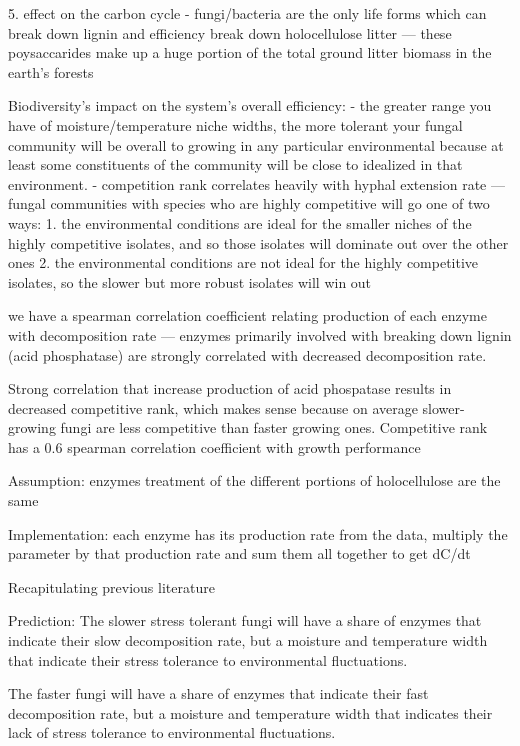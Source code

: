 \documentclass[12pt]{article}
\begin{document}
\begin{multicols}{2}
5. effect on the carbon cycle
- fungi/bacteria are the only life forms which can break down lignin and efficiency break down holocellulose litter — these poysaccarides make up a huge portion of the total ground litter biomass in the earth's forests

Biodiversity's impact on the system's overall efficiency:
- the greater range you have of moisture/temperature niche widths, the more tolerant your fungal community will be overall to growing in any particular environmental because at least some constituents of the community will be close to idealized in that environment.
- competition rank correlates heavily with hyphal extension rate — fungal communities with species who are highly competitive will go one of two ways: 1. the environmental conditions are ideal for the smaller niches of the highly competitive isolates, and so those isolates will dominate out over the other ones 2. the environmental conditions are not ideal for the highly competitive isolates, so the slower but more robust isolates will win out

we have a spearman correlation coefficient relating production of each enzyme with decomposition rate — enzymes primarily involved with breaking down lignin (acid phosphatase) are strongly correlated with decreased decomposition rate.

Strong correlation that increase production of acid phospatase results in decreased competitive rank, which makes sense because on average slower-growing fungi are less competitive than faster growing ones. Competitive rank has a 0.6 spearman correlation coefficient with growth performance

Assumption: enzymes treatment of the different portions of holocellulose are the same 

Implementation: each enzyme has its production rate from the data, multiply the parameter by that production rate and sum them all together to get dC/dt

Recapitulating previous literature


Prediction:
The slower stress tolerant fungi will have a share of enzymes that indicate their slow decomposition rate, but a moisture and temperature width that indicate their stress tolerance to environmental fluctuations. 

The faster fungi will have a share of enzymes that indicate their fast decomposition rate, but a moisture and temperature width that indicates their lack of stress tolerance to environmental fluctuations.


\end{multicols}
\end{document}
